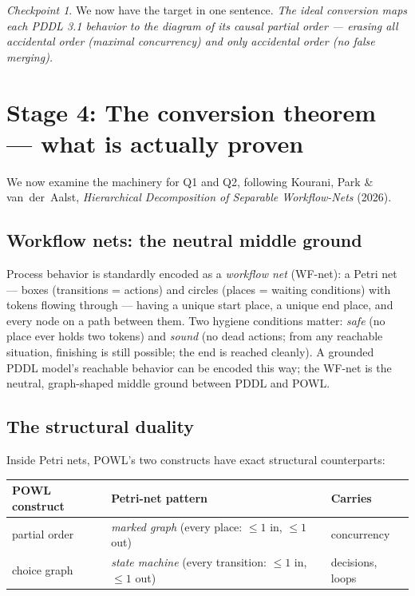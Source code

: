 \documentclass[11pt]{article}
\theoremstyle{definition}
\theoremstyle{plain}
\theoremstyle{remark}
\newtheorem{checkpoint}[definition]{Checkpoint}
\begin{document}
\begin{checkpoint}
We now have the target in one sentence. \emph{The ideal conversion maps each
PDDL 3.1 behavior to the diagram of its causal partial order --- erasing all
accidental order (maximal concurrency) and only accidental order
(no false merging).}
\end{checkpoint}

\section{Stage 4: The conversion theorem --- what is actually proven}
\label{sec:conversion}

We now examine the machinery for Q1 and Q2, following Kourani, Park \&
van~der~Aalst, \emph{Hierarchical Decomposition of Separable Workflow-Nets}
(2026).

\subsection{Workflow nets: the neutral middle ground}

Process behavior is standardly encoded as a \emph{workflow net} (WF-net): a
Petri net --- boxes (transitions = actions) and circles (places = waiting
conditions) with tokens flowing through --- having a unique start place, a
unique end place, and every node on a path between them. Two hygiene
conditions matter:
\emph{safe} (no place ever holds two tokens) and \emph{sound} (no dead
actions; from any reachable situation, finishing is still possible; the end
is reached cleanly). A grounded PDDL model's reachable behavior can be
encoded this way; the WF-net is the neutral, graph-shaped middle ground
between PDDL and POWL.

\subsection{The structural duality}

Inside Petri nets, POWL's two constructs have exact structural counterparts:

\begin{center}
\begin{tabular}{@{}lll@{}}
\toprule
POWL construct & Petri-net pattern & Carries \\
\midrule
partial order & \emph{marked graph} (every place: $\le 1$ in, $\le 1$ out) & concurrency \\
choice graph  & \emph{state machine} (every transition: $\le 1$ in, $\le 1$ out) & decisions, loops \\
\bottomrule
\end{tabular}
\end{center}
\end{document}
